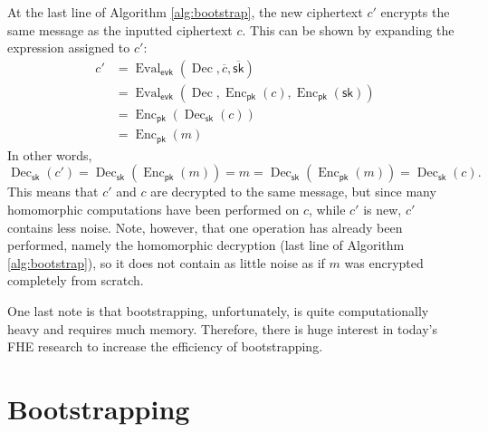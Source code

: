 At the last line of Algorithm \ref{alg:bootstrap}, the new ciphertext $c'$ encrypts the same message as the inputted ciphertext $c$. This can be shown by expanding the expression assigned to $c'$:
\begin{align*}
    c' &= \operatorname{Eval}_{\mathsf{evk}}(\operatorname{Dec}, \overline{c}, \overline{\mathsf{sk}}) \\
    &= \operatorname{Eval}_{\mathsf{evk}}(\operatorname{Dec}, \operatorname{Enc}_{\mathsf{pk}}(c), \operatorname{Enc}_{\mathsf{pk}}(\mathsf{sk})) \\
    &= \operatorname{Enc}_{\mathsf{pk}}(\operatorname{Dec}_{\mathsf{sk}}(c)) \\
    &= \operatorname{Enc}_{\mathsf{pk}}(m)
\end{align*}
In other words,
$$\operatorname{Dec}_{\mathsf{sk}}(c') = \operatorname{Dec}_{\mathsf{sk}}(\operatorname{Enc}_{\mathsf{pk}}(m)) = m = \operatorname{Dec}_{\mathsf{sk}}(\operatorname{Enc}_{\mathsf{pk}}(m)) = \operatorname{Dec}_{\mathsf{sk}}(c).$$
This means that $c'$ and $c$ are decrypted to the same message, but since many homomorphic computations have been performed on $c$, while $c'$ is new, $c'$ contains less noise. Note, however, that one operation has already been performed, namely the homomorphic decryption (last line of Algorithm \ref{alg:bootstrap}), so it does not contain as little noise as if $m$ was encrypted completely from scratch.

One last note is that bootstrapping, unfortunately, is quite computationally heavy and requires much memory. Therefore, there is huge interest in today's FHE research to increase the efficiency of bootstrapping.





\section{Bootstrapping}\label{sec:bootstrapping}



